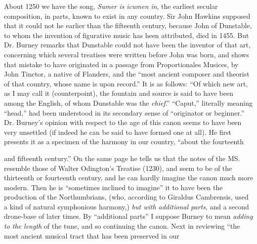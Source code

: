 About 1250 we have the song, \textit{Sumer is icumen in}, the earliest secular composition, 
in parts, known to exist in any country. Sir John Hawkins supposed that
it could not he earlier than the fifteenth century, because John of Dunstable, to
whom the invention of figurative music has heen attributed, died in 1455. But
Dr. Burney remarks that Dunstable could not have been the inventor of that art,
concerning which several treatises were written before John was born, and shows
that mistake to have originated in a passage from Proportionales Musices, by John
Tinctor, a native of Flanders, and the “most ancient composer and theorist of
that country, whose name is upon record.” It is as follows: “Of which new art,
as I may call it (counterpoint), the fountain and source is said to have been among
the English, of whom Dunstable was the \textit{chief}.” “Caput,” literally meaning
“head,” had been understood in its secondary sense of “originator or beginner.”
Dr. Burney’s opinion with respect to the age of this canon seems to have been
very unsettled (if indeed he can be said to have formed one at all). He first
presents it as a specimen of the harmony \pagebreak 
in our country, “about the fourteenth 
and fifteenth century.” On the same page he tells us that the notes of the 
MS. resemble those of Walter Odington’s Treatise (1230), and seem to be of the
thirteenth or fourteenth century, and he can hardly imagine the canon much
more modern. Then he is “sometimes inclined to imagine” it to have been
the production of the Northumbrians, (who, according to Giraldus Cambrensis,
used a kind of natural symphonious harmony,) \textit{but with additional parts}, and a
second drone-base of later times. By “additional parts” I suppose Burney
to mean \textit{adding to the length} of the tune, and so continuing the canon. Next
in reviewing “the most ancient musical tract that has been preserved in our
